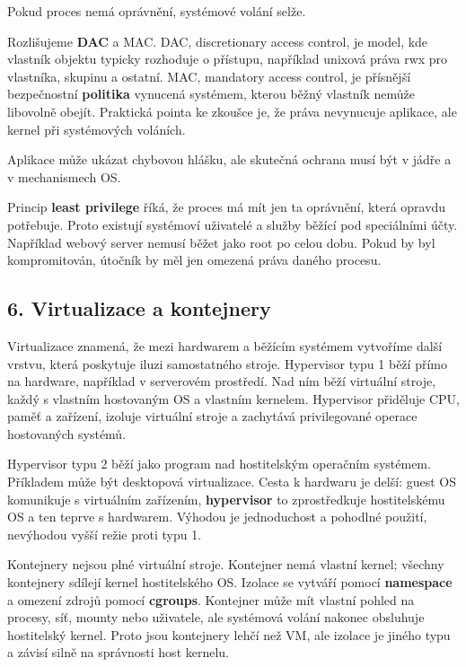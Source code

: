 Pokud proces nemá oprávnění, systémové volání selže.

Rozlišujeme \textbf{DAC} a MAC. DAC, discretionary access control, je model, kde vlastník objektu typicky rozhoduje o přístupu, například unixová práva rwx pro vlastníka, skupinu a ostatní. MAC, mandatory access control, je přísnější bezpečnostní \textbf{politika} vynucená systémem, kterou běžný vlastník nemůže libovolně obejít. Praktická pointa ke zkoušce je, že práva nevynucuje aplikace, ale kernel při systémových voláních.

Aplikace může ukázat chybovou hlášku, ale skutečná ochrana musí být v jádře a v mechanismech OS.

Princip \textbf{least privilege} říká, že proces má mít jen ta oprávnění, která opravdu potřebuje. Proto existují systémoví uživatelé a služby běžící pod speciálními účty. Například webový server nemusí běžet jako root po celou dobu. Pokud by byl kompromitován, útočník by měl jen omezená práva daného procesu.

\subsection*{6. Virtualizace a kontejnery}

Virtualizace znamená, že mezi hardwarem a běžícím systémem vytvoříme další vrstvu, která poskytuje iluzi samostatného stroje. Hypervisor typu 1 běží přímo na hardware, například v serverovém prostředí. Nad ním běží virtuální stroje, každý s vlastním hostovaným OS a vlastním kernelem. Hypervisor přiděluje CPU, paměť a zařízení, izoluje virtuální stroje a zachytává privilegované operace hostovaných systémů.

Hypervisor typu 2 běží jako program nad hostitelským operačním systémem. Příkladem může být desktopová virtualizace. Cesta k hardwaru je delší: guest OS komunikuje s virtuálním zařízením, \textbf{hypervisor} to zprostředkuje hostitelskému OS a ten teprve s hardwarem. Výhodou je jednoduchost a pohodlné použití, nevýhodou vyšší režie proti typu 1.

Kontejnery nejsou plné virtuální stroje. Kontejner nemá vlastní kernel; všechny kontejnery sdílejí kernel hostitelského OS. Izolace se vytváří pomocí \textbf{namespace} a omezení zdrojů pomocí \textbf{cgroups}. Kontejner může mít vlastní pohled na procesy, síť, mounty nebo uživatele, ale systémová volání nakonec obsluhuje hostitelský kernel. Proto jsou kontejnery lehčí než VM, ale izolace je jiného typu a závisí silně na správnosti host kernelu.

